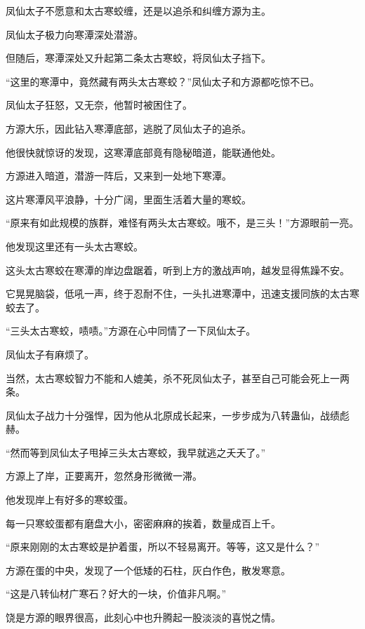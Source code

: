 
\begin{this_body}



凤仙太子不愿意和太古寒蛟缠，还是以追杀和纠缠方源为主。

凤仙太子极力向寒潭深处潜游。

但随后，寒潭深处又升起第二条太古寒蛟，将凤仙太子挡下。

“这里的寒潭中，竟然藏有两头太古寒蛟？”凤仙太子和方源都吃惊不已。

凤仙太子狂怒，又无奈，他暂时被困住了。

方源大乐，因此钻入寒潭底部，逃脱了凤仙太子的追杀。

他很快就惊讶的发现，这寒潭底部竟有隐秘暗道，能联通他处。

方源进入暗道，潜游一阵后，又来到一处地下寒潭。

这片寒潭风平浪静，十分广阔，里面生活着大量的寒蛟。

“原来有如此规模的族群，难怪有两头太古寒蛟。哦不，是三头！”方源眼前一亮。

他发现这里还有一头太古寒蛟。

这头太古寒蛟在寒潭的岸边盘踞着，听到上方的激战声响，越发显得焦躁不安。

它晃晃脑袋，低吼一声，终于忍耐不住，一头扎进寒潭中，迅速支援同族的太古寒蛟去了。

“三头太古寒蛟，啧啧。”方源在心中同情了一下凤仙太子。

凤仙太子有麻烦了。

当然，太古寒蛟智力不能和人媲美，杀不死凤仙太子，甚至自己可能会死上一两条。

凤仙太子战力十分强悍，因为他从北原成长起来，一步步成为八转蛊仙，战绩彪赫。

“然而等到凤仙太子甩掉三头太古寒蛟，我早就逃之夭夭了。”

方源上了岸，正要离开，忽然身形微微一滞。

他发现岸上有好多的寒蛟蛋。

每一只寒蛟蛋都有磨盘大小，密密麻麻的挨着，数量成百上千。

“原来刚刚的太古寒蛟是护着蛋，所以不轻易离开。等等，这又是什么？”

方源在蛋的中央，发现了一个低矮的石柱，灰白作色，散发寒意。

“这是八转仙材广寒石？好大的一块，价值非凡啊。”

饶是方源的眼界很高，此刻心中也升腾起一股淡淡的喜悦之情。


\end{this_body}
